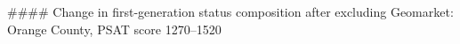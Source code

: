 #### Change in first-generation status composition after excluding Geomarket: Orange County, PSAT score 1270–1520
